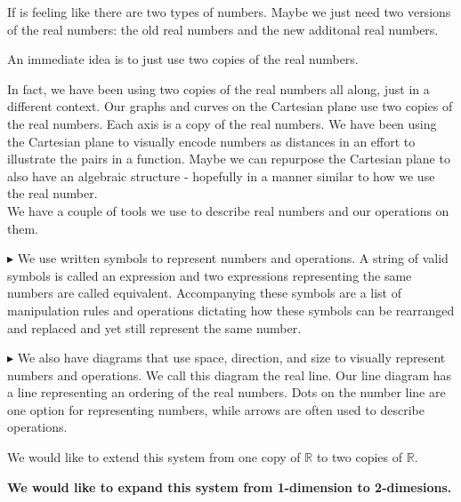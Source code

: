 \documentclass{ximera}
\begin{document}
If is feeling like there are two types of numbers. Maybe we just need two versions of the real numbers: the old real numbers and the new additonal real numbers.





\begin{center}
An immediate idea is to just use two copies of the real numbers.
\end{center}


In fact, we have been using two copies of the real numbers all along, just in a different context. Our graphs and curves on the Cartesian plane use two copies of the real numbers.  Each axis is a copy of the real numbers. We have been using the Cartesian plane to visually encode numbers as distances in an effort to illustrate the pairs in a function. Maybe we can repurpose the Cartesian plane to also have an algebraic structure - hopefully in a manner similar to how we use the real number. \\








We have a couple of tools we use to describe real numbers and our operations on them.


$\blacktriangleright$  We use written symbols to represent numbers and operations.  A string of valid symbols is called an expression and two expressions representing the same numbers are called equivalent. Accompanying these symbols are a list of manipulation rules and operations dictating how these symbols can be rearranged and replaced and yet still represent the same number.  


$\blacktriangleright$  We also have diagrams that use space, direction, and size to visually represent numbers and operations. We call this diagram the real line. Our line diagram has a line representing an ordering of the real numbers. Dots on the number line are one option for representing numbers, while arrows are often used to describe operations.


We would like to extend this system from one copy of \textbf{$\mathbb{R}$} to two copies of \textbf{$\mathbb{R}$}. \\



\begin{center}
\textbf{\textcolor{red!90!darkgray}{We would like to expand this system from 1-dimension to 2-dimesions.}}
\end{center}
\end{document}
